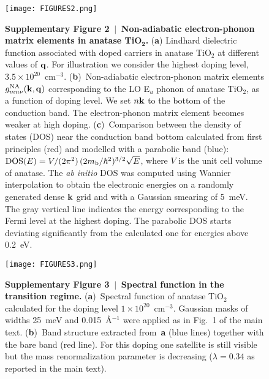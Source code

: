 \documentclass[12pt]{nature-mod}
\def\bk{{\bf k}}
\def\bq{{\bf q}}
\begin{document}
 \begin{figure}
 \begin{center}
 \hspace*{-8pt} \texttt{[image: FIGURES2.png]}
 \end{center}
 \textbf{Supplementary Figure 2 $\,\bm|\,$ Non-adiabatic electron-phonon matrix elements in anatase 
 TiO$_{\bm2}$.} ({\bf a}) Lindhard dielectric function associated with doped carriers in anatase TiO$_2$ 
 at different values of $\bq$. For illustration we consider the highest doping level, 
 $3.5\times10^{20}$~cm$^{-3}$.
 ({\bf b})~Non-adiabatic electron-phonon matrix elements $g^{\rm NA}_{mn\nu}(\bk,\bq)$ corresponding 
 to the LO E$_u$ phonon of anatase TiO$_2$, as a function of doping level. We set $n\bk$ to the 
 bottom of the conduction band. The electron-phonon matrix element becomes weaker at high doping.
 ({\bf c})~Comparison between the density of states (DOS) near the conduction band bottom 
 calculated from first principles (red) and modelled with a parabolic band (blue): 
 $\mbox{DOS}(E)=V/(2\pi^2)\,(2m_{\rm b}/\hbar^2)^{3/2}\sqrt{E}$, where $V$ is the unit cell 
 volume of anatase. The \emph{ab initio} DOS was computed using Wannier interpolation to obtain the 
 electronic energies on a randomly generated dense $\bk$ grid and with a Gaussian smearing of 5~meV. 
 The gray vertical line indicates the energy corresponding to the Fermi level at the highest doping. 
 The parabolic DOS starts deviating significantly from the calculated one for energies above 0.2~eV. 
 \end{figure}
 
\clearpage

 \begin{figure}
 \begin{center}
 \hspace*{-8pt} \texttt{[image: FIGURES3.png]}
 \end{center}
 \textbf{Supplementary Figure 3 $\,\bm|\,$ Spectral function in the transition regime.}
 ({\bf a})~Spectral function of anatase TiO$_2$ calculated for the doping level $1\times10^{20}$~cm$^{-3}$. 
 Gaussian masks of widths 25~meV and 0.015~\AA$^{-1}$ were applied as in Fig.~1 of the main text. 
 ({\bf b})~Band structure extracted from~{\bf a} (blue lines) together with the bare band (red line). 
 For this doping one satellite is still visible but the mass renormalization parameter is decreasing 
 ($\lambda=0.34$ as reported in the main text).
 \end{figure}
 
\end{document}

